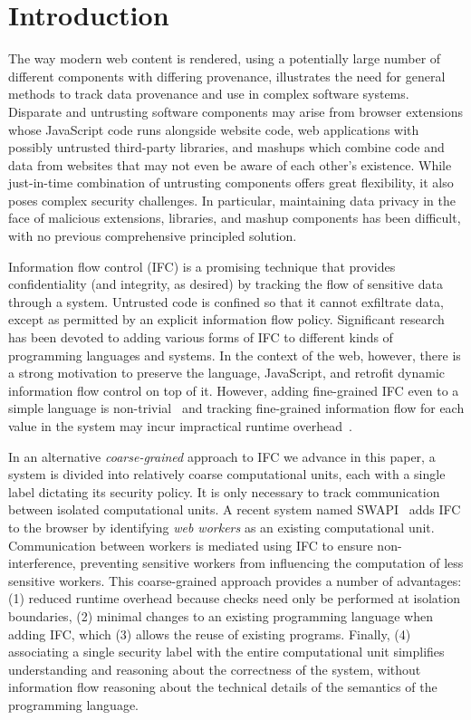 \section{Introduction}
\label{sec:intro}

The way modern web content is rendered, using a potentially large number of
different components with differing provenance, illustrates the need for 
general methods to track data provenance and use in complex software systems.
Disparate and untrusting software components may arise from browser
extensions whose JavaScript code runs alongside website
code, web applications with possibly untrusted third-party
libraries, and mashups which combine code and data from
websites that may not even be aware of each other's existence.
While just-in-time combination of untrusting components
offers great flexibility, it also poses complex security challenges.
In particular, maintaining data privacy in the face of malicious
extensions, libraries, and mashup components has been difficult,
with no previous comprehensive principled solution.

Information flow control (IFC) is a promising technique
that provides confidentiality (and integrity, as desired)
by tracking the flow of sensitive data through a system.
Untrusted code is confined so that it cannot exfiltrate data, except as
permitted by an explicit information flow policy.  
Significant research has been devoted to
adding various forms of IFC to different kinds of programming languages
and systems.  In the context of the web, however, there is a strong
motivation to preserve the language, JavaScript, and retrofit dynamic information
flow control on top of it.  
However, adding fine-grained IFC even to a simple language is
non-trivial~\cite{hritcu2013testing} and 
tracking fine-grained information flow for each
value in the system may incur
impractical runtime overhead~\cite{JSFlow}.

In an alternative \textit{coarse-grained} approach to IFC we advance 
in this paper, a system is divided into relatively coarse computational units,
each with a single label dictating its security policy.
It is only necessary to track
communication between isolated computational units.
A recent system named SWAPI~\cite{swapi} adds IFC to the
browser by identifying \emph{web workers} as an existing computational
unit.  Communication between workers is mediated using
IFC to ensure non-interference, preventing sensitive workers from
influencing the computation of less sensitive workers.
This coarse-grained approach provides a number of advantages:
(1) reduced runtime overhead because checks need only
be performed at isolation boundaries, (2) minimal changes to an
existing programming language when adding IFC, which (3) allows
the reuse of existing programs.  Finally, (4) associating
a single security label with the entire computational unit simplifies
understanding and reasoning about the correctness of the
system, without information flow reasoning about the
technical details of the semantics of the programming language.

